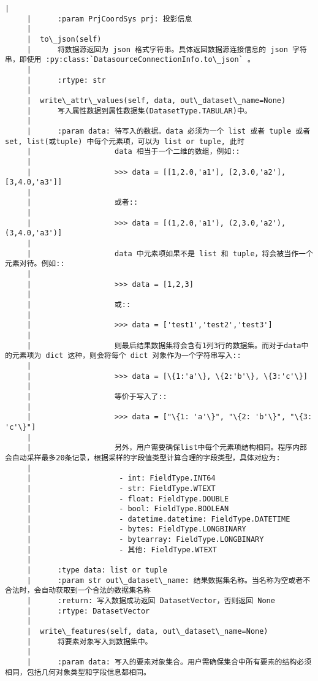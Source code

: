 \documentclass[11pt]{article}
\begin{document}
\begin{Verbatim}[commandchars=\\\{\}]
     |      
     |      :param PrjCoordSys prj: 投影信息
     |  
     |  to\_json(self)
     |      将数据源返回为 json 格式字符串。具体返回数据源连接信息的 json 字符串，即使用 :py:class:`DatasourceConnectionInfo.to\_json` 。
     |      
     |      :rtype: str
     |  
     |  write\_attr\_values(self, data, out\_dataset\_name=None)
     |      写入属性数据到属性数据集(DatasetType.TABULAR)中。
     |      
     |      :param data: 待写入的数据。data 必须为一个 list 或者 tuple 或者 set, list(或tuple) 中每个元素项，可以为 list or tuple, 此时
     |                   data 相当于一个二维的数组，例如::
     |      
     |                   >>> data = [[1,2.0,'a1'], [2,3.0,'a2'], [3,4.0,'a3']]
     |      
     |                   或者::
     |      
     |                   >>> data = [(1,2.0,'a1'), (2,3.0,'a2'), (3,4.0,'a3')]
     |      
     |                   data 中元素项如果不是 list 和 tuple，将会被当作一个元素对待。例如::
     |      
     |                   >>> data = [1,2,3]
     |      
     |                   或::
     |      
     |                   >>> data = ['test1','test2','test3']
     |      
     |                   则最后结果数据集将会含有1列3行的数据集。而对于data中的元素项为 dict 这种，则会将每个 dict 对象作为一个字符串写入::
     |      
     |                   >>> data = [\{1:'a'\}, \{2:'b'\}, \{3:'c'\}]
     |      
     |                   等价于写入了::
     |      
     |                   >>> data = ["\{1: 'a'\}", "\{2: 'b'\}", "\{3: 'c'\}"]
     |      
     |                   另外，用户需要确保list中每个元素项结构相同。程序内部会自动采样最多20条记录，根据采样的字段值类型计算合理的字段类型，具体对应为:
     |      
     |                    - int: FieldType.INT64
     |                    - str: FieldType.WTEXT
     |                    - float: FieldType.DOUBLE
     |                    - bool: FieldType.BOOLEAN
     |                    - datetime.datetime: FieldType.DATETIME
     |                    - bytes: FieldType.LONGBINARY
     |                    - bytearray: FieldType.LONGBINARY
     |                    - 其他: FieldType.WTEXT
     |      
     |      :type data: list or tuple
     |      :param str out\_dataset\_name: 结果数据集名称。当名称为空或者不合法时，会自动获取到一个合法的数据集名称
     |      :return: 写入数据成功返回 DatasetVector，否则返回 None
     |      :rtype: DatasetVector
     |  
     |  write\_features(self, data, out\_dataset\_name=None)
     |      将要素对象写入到数据集中。
     |      
     |      :param data: 写入的要素对象集合。用户需确保集合中所有要素的结构必须相同，包括几何对象类型和字段信息都相同。

\end{Verbatim}
\end{document}
